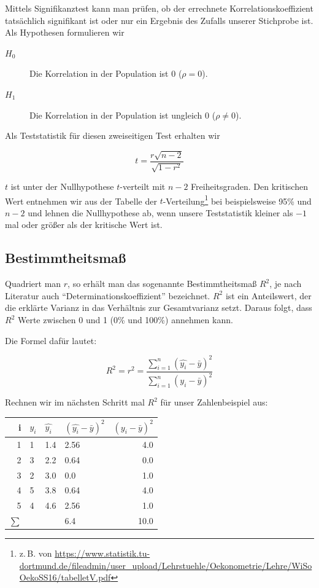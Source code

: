 \documentclass[ngerman, 12pt,parskip=half]{scrartcl}
\begin{document}
Mittels Signifikanztest kann man prüfen, ob der errechnete Korrelationskoeffizient tatsächlich signifikant ist oder nur ein Ergebnis des Zufalls unserer Stichprobe ist. Als Hypothesen formulieren wir

\begin{description}
\item[\(H_0\)] Die Korrelation in der Population ist 0 (\(\rho =0\)).
\item[\(H_1\)] Die Korrelation in der Population ist ungleich 0 (\(\rho\not=0\)).
\end{description}

Als Teststatistik für diesen zweiseitigen Test erhalten wir 

\begin{equation}
t = \frac{r\sqrt{n-2}}{\sqrt{1-r^2}}
\end{equation}

\(t\) ist unter der Nullhypothese \(t\)-verteilt mit \(n-2\) Freiheitsgraden. Den kritischen Wert entnehmen wir aus der Tabelle der \(t\)-Verteilung\footnote{z.\,B. von \url{https://www.statistik.tu-dortmund.de/fileadmin/user_upload/Lehrstuehle/Oekonometrie/Lehre/WiSoOekoSS16/tabelletV.pdf}} bei beispielsweise 95\% und \(n-2\)
und lehnen die Nullhypothese ab, wenn unsere Teststatistik kleiner als \(-1\) mal oder größer als der kritische Wert ist.


\subsection{Bestimmtheitsmaß}

Quadriert man \(r\), so erhält man das sogenannte Bestimmtheitsmaß \(R^2\), je nach Literatur auch \enquote{Determinationskoeffizient} bezeichnet. \(R^2\) ist ein Anteilswert, der die erklärte Varianz in das Verhältnis zur Gesamtvarianz setzt. Daraus folgt, dass \(R^2\) Werte zwischen 0 und 1 (0\% und 100\%) annehmen kann. 

Die Formel dafür lautet:

\begin{equation}
R^2 = r^2 = \frac{\sum_{i=1}^n (\hat{y_i} - \bar{y})^2} {\sum_{i=1}^n (y_i - \bar{y})^2}
\end{equation}

Rechnen wir im nächsten Schritt mal \(R^2\) für unser Zahlenbeispiel aus:

\begin{center}
\begin{tabular}{r|lllr} \toprule
i & \(y_i\)  & \(\hat{y_i}\) & \((\hat{y_i} - \bar{y})^2 \)&  \((y_i - \bar{y})^2\) \\ \midrule
1 & 1 &  1.4 & 2.56    & 4.0\\
2 & 3 &  2.2 &  0.64 & 0.0\\
3 & 2 &  3.0 & 0.0     & 1.0\\ 
4 & 5 &  3.8 & 0.64    & 4.0\\ 
5 & 4 &  4.6 & 2.56    & 1.0\\ \midrule
\(\sum\) & & & 6.4 & 10.0\\ \bottomrule
\end{tabular}
\end{center}
\end{document}

